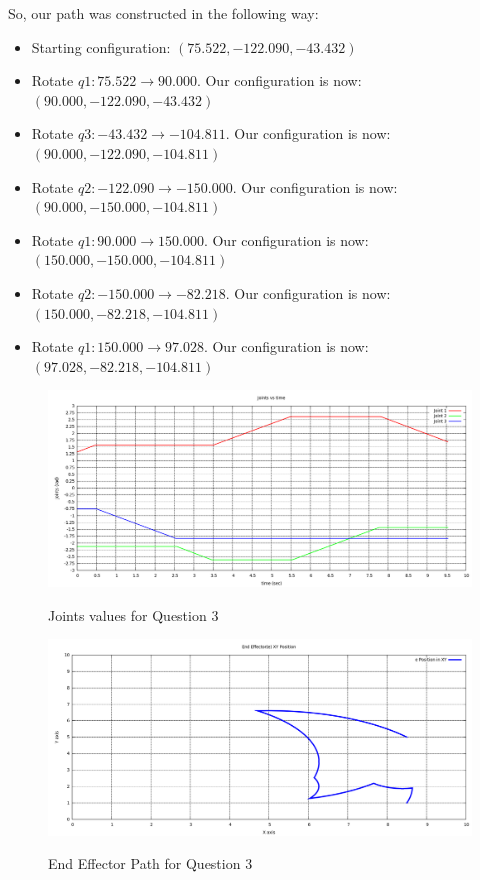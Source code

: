 \documentclass[10pt,a4paper]{article}
\begin{document}
So, our path was constructed in the following way:
\begin{itemize}
\item{ Starting configuration: $(75.522, -122.090, -43.432)$}
\item{ Rotate $q1: 75.522 \rightarrow 90.000$. Our configuration is now: $(90.000, -122.090, -43.432)$}
\item{ Rotate $q3: -43.432 \rightarrow -104.811$. Our configuration is now: $(90.000, -122.090, -104.811)$}
\item{ Rotate $q2: -122.090 \rightarrow -150.000$. Our configuration is now: $(90.000, -150.000, -104.811)$}
\item{ Rotate $q1: 90.000 \rightarrow 150.000$. Our configuration is now: $(150.000, -150.000, -104.811)$}
\item{ Rotate $q2: -150.000 \rightarrow -82.218$. Our configuration is now: $(150.000, -82.218, -104.811)$}
\item{ Rotate $q1: 150.000 \rightarrow 97.028$. Our configuration is now: $(97.028, -82.218, -104.811)$}
\end{itemize}


	\begin{figure}[H]
	\includegraphics[angle = 0, scale = 0.3]{figures/Q3Joints.png} 
	\label{fig:Q3Joints}
	\caption{ Joints values for Question 3}
	\end{figure}

	\begin{figure}[H]
	\includegraphics[angle = 0, scale = 0.3]{figures/Q3EEPos.png} 
	\label{fig:Q3EEPos}
	\caption{ End Effector Path for Question 3}
	\end{figure}
	
\end{document}

